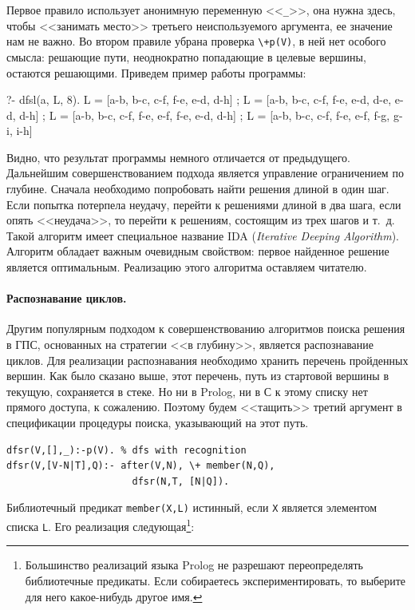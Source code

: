 \documentclass[a4paper,14pt, openany, twoside, draft]{extbook} %
\newcommand{\eeng}[1]{\emph{\foreignlanguage{english}{#1}}}
\begin{document}
Первое правило использует анонимную переменную <<\texttt{\_}>>, она нужна здесь, чтобы <<занимать место>> третьего неиспользуемого аргумента, ее значение нам не важно.  Во втором правиле убрана проверка \texttt{\backslash +p(V)}, в ней нет особого смысла: решающие пути, неоднократно попадающие в целевые вершины, остаются решающими.  Приведем пример работы программы:

\begin{proexp}
?- dfsl(a, L, 8).
L = [a-b, b-c, c-f, f-e, e-d, d-h] ;
L = [a-b, b-c, c-f, f-e, e-d, d-e, e-d, d-h] ;
L = [a-b, b-c, c-f, f-e, e-f, f-e, e-d, d-h] ;
L = [a-b, b-c, c-f, f-e, e-f, f-g, g-i, i-h]
\end{proexp}

Видно, что результат программы немного отличается от предыдущего.  Дальнейшим совершенствованием подхода является управление ограничением по глубине.  Сначала необходимо попробовать найти решения длиной в один шаг.  Если попытка потерпела неудачу, перейти к решениями длиной в два шага, если опять <<неудача>>, то перейти к решениям, состоящим из трех шагов и т.~д.  Такой алгоритм имеет специальное название IDA (\eeng{Iterative Deeping Algorithm}).  Алгоритм обладает важным очевидным свойством: первое найденное решение является оптимальным.  Реализацию этого алгоритма оставляем читателю.

\paragraph{Распознавание циклов.}  Другим популярным подходом к совершенствованию алгоритмов поиска решения в ГПС, основанных на стратегии <<в глубину>>, является распознавание циклов.  Для реализации распознавания необходимо хранить перечень пройденных вершин.  Как было сказано выше, этот перечень, путь из стартовой вершины в текущую, сохраняется в стеке.  Но ни в Prolog, ни в С к этому списку нет прямого доступа, к сожалению.  Поэтому будем <<тащить>> третий аргумент в спецификации процедуры поиска, указывающий на этот путь.

\begin{verbatim}
dfsr(V,[],_):-p(V). % dfs with recognition
dfsr(V,[V-N|T],Q):- after(V,N), \+ member(N,Q),
                      dfsr(N,T, [N|Q]).
\end{verbatim}


Библиотечный предикат \texttt{member(X,L)} истинный, если \texttt{X} является элементом списка \texttt{L}.  Его реализация следующая\footnote{Большинство реализаций языка Prolog не разрешают переопределять библиотечные предикаты.  Если собираетесь экспериментировать, то выберите для него какое-нибудь другое имя.}:
\end{document}
